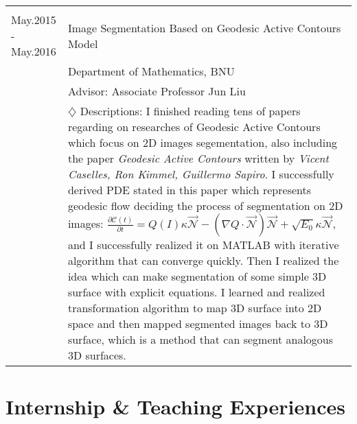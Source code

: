 \documentclass[a4paper,11pt]{article} %
\begin{document}
\begin{longtable}{p{4cm}|p{11cm}}
\multicolumn{2}{c}{}\\
May.2015 - May.2016 & Image Segmentation Based on Geodesic Active Contours Model\\
& Department of Mathematics, BNU\\
& \footnotesize{Advisor: Associate Professor Jun Liu}\\
& \footnotesize{$\diamondsuit$ Descriptions: I finished reading tens of papers regarding on researches of Geodesic Active Contours which focus on 2D images segementation, also including the paper \emph{Geodesic Active Contours} written by \emph{Vicent Caselles, Ron Kimmel, Guillermo Sapiro}. I successfully derived PDE stated in this paper which represents geodesic flow deciding the process of segmentation on 2D images: $\frac{\partial \mathcal{C}(t)}{\partial t} = Q(I)\kappa \vec{\mathcal{N}} - (\nabla Q \cdot \vec{\mathcal{N}})\vec{\mathcal{N}} + \sqrt{E_0} \kappa \vec{\mathcal{N}}$, and I successfully realized it on MATLAB with iterative algorithm that can converge quickly. Then I realized the idea which can make segmentation of some simple 3D surface with explicit equations. I learned and realized transformation algorithm to map 3D surface into 2D space and then mapped segmented images back to 3D surface, which is a method that can segment analogous 3D surfaces.}\\

\end{longtable}

\section{Internship \& Teaching Experiences}
\end{document}
